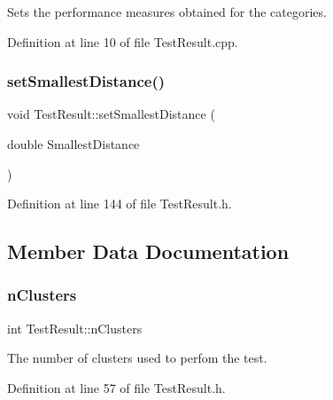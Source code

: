 Sets the performance measures obtained for the categories. 

Definition at line 10 of file Test\+Result.\+cpp.

\mbox{\label{class_test_result_a81a7c2e2b80e316df3f5ad9a8144a454}} 
\subsubsection{\texorpdfstring{set\+Smallest\+Distance()}{setSmallestDistance()}}
{\footnotesize\ttfamily void Test\+Result\+::set\+Smallest\+Distance (\begin{DoxyParamCaption}\item[{double}]{Smallest\+Distance }\end{DoxyParamCaption})\hspace{0.3cm}{\ttfamily [inline]}}



Definition at line 144 of file Test\+Result.\+h.



\subsection{Member Data Documentation}
\mbox{\label{class_test_result_add83898b67f41cc78be15efef7748ac0}} 
\subsubsection{\texorpdfstring{n\+Clusters}{nClusters}}
{\footnotesize\ttfamily int Test\+Result\+::n\+Clusters\hspace{0.3cm}{\ttfamily [protected]}}

The number of clusters used to perfom the test. 

Definition at line 57 of file Test\+Result.\+h.

\mbox{\label{class_test_result_a35cefffa1f0be43a99b0061c03008c16}} 
